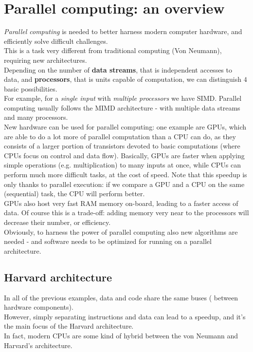 \documentclass[../template.tex]{subfiles}
\begin{document}
\section{Parallel computing: an overview}
\textit{Parallel computing} is needed to better harness modern computer hardware, and efficiently solve difficult challenges.\\
This is a task very different from traditional computing (Von Neumann), requiring new architectures.\\
Depending on the number of \textbf{data streams}, that is independent accesses to data, and \textbf{processors}, that is units capable of computation, we can distinguish $4$ basic possibilities.\\

For example, for a \textit{single input} with \textit{multiple processors} we have SIMD. Parallel computing usually follows the MIMD architecture - with multiple data streams and many processors.\\

New hardware can be used for parallel computing: one example are GPUs, which are able to do a lot more of parallel computation than a CPU can do, as they consists of a larger portion of transistors devoted to basic computations (where CPUs focus on control and data flow). Basically, GPUs are faster when applying simple operations (e.g. multiplication) to many inputs at once, while CPUs can perform much more difficult tasks, at the cost of speed. Note that this speedup is only thanks to parallel execution: if we compare a GPU and a CPU on the same (sequential) task, the CPU will perform better.\\

GPUs also host very fast RAM memory on-board, leading to a faster access of data. Of course this is a trade-off: adding memory very near to the processors will decrease their number, or efficiency.\\

Obviously, to harness the power of parallel computing also new algorithms are needed - and software needs to be optimized for running on a parallel architecture.

\subsection{Harvard architecture}
In all of the previous examples, data and code share the same buses ( between hardware components).\\
However, simply separating instructions and data can lead to a speedup, and it's the main focus of the Harvard architecture.\\
In fact, modern CPUs are some kind of hybrid between the von Neumann and Harvard's architecture.\\
\end{document}
